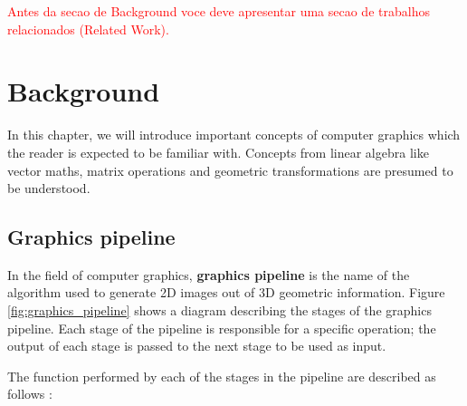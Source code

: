 \textcolor{red}{Antes da secao de Background voce deve apresentar uma secao de trabalhos relacionados (Related Work).}

\chapter{Background}


In this chapter, we will introduce important concepts of computer graphics which the reader is expected to be familiar with. Concepts from linear algebra like vector maths, matrix operations and geometric transformations are presumed to be understood.

\section{Graphics pipeline}
In the field of computer graphics, \textbf{graphics pipeline} is the name of the algorithm used to generate 2D images out of 3D geometric information. Figure \ref{fig:graphics_pipeline} shows a diagram describing the stages of the graphics pipeline. Each stage of the pipeline is responsible for a specific operation; the output of each stage is passed to the next stage to be used as input.

The function performed by each of the stages in the pipeline are described as follows \cite{vulkan_tutorial}:

